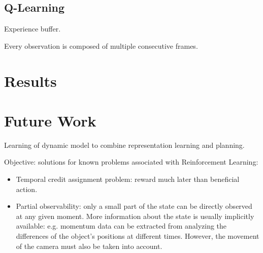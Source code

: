 \documentclass[10pt,a4paper]{article}
\begin{document}
\subsection{Q-Learning}

Experience buffer.

Every observation is composed of multiple consecutive frames.

\section{Results}


\section{Future Work}

Learning of dynamic model to combine representation learning and planning.

Objective: solutions for known problems associated with Reinforcement Learning:

\begin{itemize}
\item 
Temporal credit assignment problem: reward much later than beneficial action.

\item
Partial observability: only a small part of the state can be directly observed at any given moment.
More information about the state is usually implicitly available:
e.g. momentum data can be extracted from analyzing the differences of the object's positions at different times. However, the movement of the camera must also be taken into account.

\end{itemize}
\end{document}
